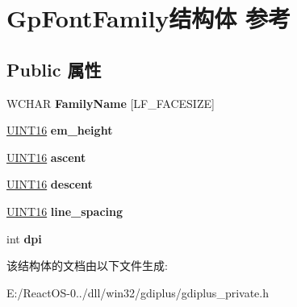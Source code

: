 \hypertarget{struct_gp_font_family}{}\section{Gp\+Font\+Family结构体 参考}
\label{struct_gp_font_family}
\subsection*{Public 属性}
\begin{DoxyCompactItemize}
\item 
\mbox{\label{struct_gp_font_family_a91f7ce05b519457fd76951f86a02415c}} 
W\+C\+H\+AR {\bfseries Family\+Name} \mbox{[}L\+F\+\_\+\+F\+A\+C\+E\+S\+I\+ZE\mbox{]}
\item 
\mbox{\label{struct_gp_font_family_a1f15298c24be67514ea5b508cc8b8a41}} 
\hyperlink{_processor_bind_8h_a09f1a1fb2293e33483cc8d44aefb1eb1}{U\+I\+N\+T16} {\bfseries em\+\_\+height}
\item 
\mbox{\label{struct_gp_font_family_aa1950172946f60e8c5a4ba4bce9c42c4}} 
\hyperlink{_processor_bind_8h_a09f1a1fb2293e33483cc8d44aefb1eb1}{U\+I\+N\+T16} {\bfseries ascent}
\item 
\mbox{\label{struct_gp_font_family_a82a5a178eeea7761f956596a0b00b6b0}} 
\hyperlink{_processor_bind_8h_a09f1a1fb2293e33483cc8d44aefb1eb1}{U\+I\+N\+T16} {\bfseries descent}
\item 
\mbox{\label{struct_gp_font_family_a32f55361e6cb92283b3af912c840fad3}} 
\hyperlink{_processor_bind_8h_a09f1a1fb2293e33483cc8d44aefb1eb1}{U\+I\+N\+T16} {\bfseries line\+\_\+spacing}
\item 
\mbox{\label{struct_gp_font_family_a1378c17122a2c07e19331407b6b79070}} 
int {\bfseries dpi}
\end{DoxyCompactItemize}


该结构体的文档由以下文件生成\+:\begin{DoxyCompactItemize}
\item 
E\+:/\+React\+O\+S-\/0../dll/win32/gdiplus/gdiplus\+\_\+private.\+h\end{DoxyCompactItemize}
